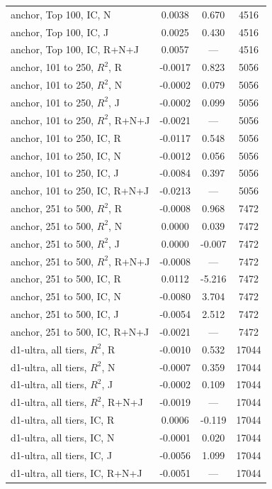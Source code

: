 \begin{longtable}{@{}lS[table-format=-1.4]S[table-format=-1.3]S[table-format=5.0]@{}}
anchor, Top 100, IC, N & 0.0038 & 0.670 & 4516 \\
anchor, Top 100, IC, J & 0.0025 & 0.430 & 4516 \\
anchor, Top 100, IC, R+N+J & 0.0057 & {---} & 4516 \\
anchor, 101 to 250, $R^2$, R & -0.0017 & 0.823 & 5056 \\
anchor, 101 to 250, $R^2$, N & -0.0002 & 0.079 & 5056 \\
anchor, 101 to 250, $R^2$, J & -0.0002 & 0.099 & 5056 \\
anchor, 101 to 250, $R^2$, R+N+J & -0.0021 & {---} & 5056 \\
anchor, 101 to 250, IC, R & -0.0117 & 0.548 & 5056 \\
anchor, 101 to 250, IC, N & -0.0012 & 0.056 & 5056 \\
anchor, 101 to 250, IC, J & -0.0084 & 0.397 & 5056 \\
anchor, 101 to 250, IC, R+N+J & -0.0213 & {---} & 5056 \\
anchor, 251 to 500, $R^2$, R & -0.0008 & 0.968 & 7472 \\
anchor, 251 to 500, $R^2$, N & 0.0000 & 0.039 & 7472 \\
anchor, 251 to 500, $R^2$, J & 0.0000 & -0.007 & 7472 \\
anchor, 251 to 500, $R^2$, R+N+J & -0.0008 & {---} & 7472 \\
anchor, 251 to 500, IC, R & 0.0112 & -5.216 & 7472 \\
anchor, 251 to 500, IC, N & -0.0080 & 3.704 & 7472 \\
anchor, 251 to 500, IC, J & -0.0054 & 2.512 & 7472 \\
anchor, 251 to 500, IC, R+N+J & -0.0021 & {---} & 7472 \\
d1-ultra, all tiers, $R^2$, R & -0.0010 & 0.532 & 17044 \\
d1-ultra, all tiers, $R^2$, N & -0.0007 & 0.359 & 17044 \\
d1-ultra, all tiers, $R^2$, J & -0.0002 & 0.109 & 17044 \\
d1-ultra, all tiers, $R^2$, R+N+J & -0.0019 & {---} & 17044 \\
d1-ultra, all tiers, IC, R & 0.0006 & -0.119 & 17044 \\
d1-ultra, all tiers, IC, N & -0.0001 & 0.020 & 17044 \\
d1-ultra, all tiers, IC, J & -0.0056 & 1.099 & 17044 \\
d1-ultra, all tiers, IC, R+N+J & -0.0051 & {---} & 17044 \\

\end{longtable}
